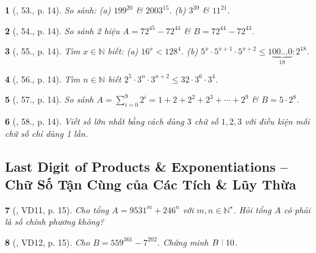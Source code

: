 \documentclass{article}
\newtheorem{baitoan}{}
\DeclareRobustCommand{\divby}{%
	\mathrel{\vbox{\baselineskip.65ex\lineskiplimit0pt\hbox{.}\hbox{.}\hbox{.}}}%
}
\begin{document}
\begin{baitoan}[\cite{Tuyen_Toan_6}, 53., p. 14]
	So sánh: (a) $199^{20}$ \& $2003^{15}$. (b) $3^{39}$ \& $11^{21}$.
\end{baitoan}

\begin{baitoan}[\cite{Tuyen_Toan_6}, 54., p. 14]
	So sánh 2 hiệu $A = 72^{45} - 72^{44}$ \& $B = 72^{44} - 72^{43}$.
\end{baitoan}

\begin{baitoan}[\cite{Tuyen_Toan_6}, 55., p. 14]
	Tìm $x\in\mathbb{N}$ biết: (a) $16^x < 128^4$. (b) $5^x\cdot5^{x + 1}\cdot5^{x + 2}\le1\underbrace{00\ldots0}_{18}:2^{18}$.
\end{baitoan}

\begin{baitoan}[\cite{Tuyen_Toan_6}, 56., p. 14]
	Tìm $n\in\mathbb{N}$ biết $2^5\cdot3^n\cdot3^{n + 2}\le32\cdot3^6\cdot3^4$.
\end{baitoan}

\begin{baitoan}[\cite{Tuyen_Toan_6}, 57., p. 14]
	So sánh $A = \sum_{i=0}^9 2^i = 1 + 2 + 2^2 + 2^3 + \cdots + 2^9$ \& $B = 5\cdot2^8$.
\end{baitoan}

\begin{baitoan}[\cite{Tuyen_Toan_6}, 58., p. 14]
	Viết số lớn nhất bằng cách dùng $3$ chữ số $1,2,3$ với điều kiện mỗi chữ số chỉ dùng 1 lần.
\end{baitoan}


\subsection{Last Digit of Products \& Exponentiations -- Chữ Số Tận Cùng của Các Tích \& Lũy Thừa}

\begin{baitoan}[\cite{Tuyen_Toan_6}, VD11, p. 15]
	Cho tổng $A = 9531^m + 246^n$ với $m,n\in\mathbb{N}^\star$. Hỏi tổng $A$ có phải là số chính phương không?
\end{baitoan}

\begin{baitoan}[\cite{Tuyen_Toan_6}, VD12, p. 15]
	Cho $B = 559^{361} - 7^{202}$. Chứng minh $B\divby10$.
\end{baitoan}
\end{document}
